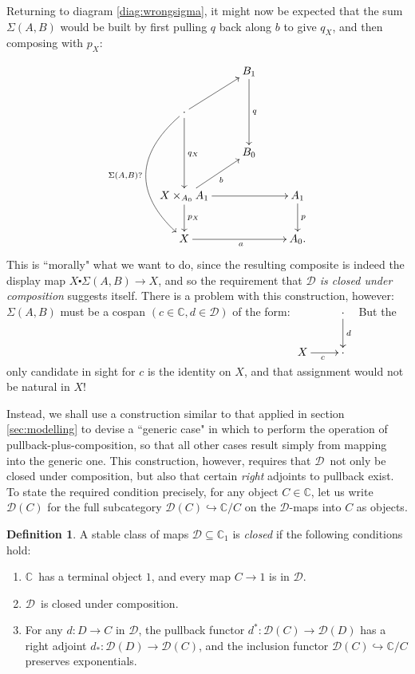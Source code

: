 \documentclass[12pt]{article}
\newcommand{\C}{\ensuremath{\mathbb{C}}}
\newcommand{\D}{\ensuremath{\mathcal{D}}}
\newcommand{\hook}{\ensuremath{\hookrightarrow}}
\newcommand{\btexdot}[2]{\ensuremath{{#1}\!\centerdot\!{#2}}}
\theoremstyle{definition}
\newtheorem{definition}[theorem]{Definition}
\begin{document}
Returning to diagram \eqref{diag:wrongsigma}, it might now be expected that the sum $\Sigma(A,B)$ would be built by first pulling $q$ back along $b$ to give $q_X$, and then composing with $p_X$:

\begin{equation}\label{diag:wrongsigma2}
\xymatrix{
& B_1 \ar[dd]^{q} &\\
\cdot \ar@/_8ex /[ddd]_{\Sigma(A,B)?} \ar[ru] \ar[dd]^{q_X} && \\
& B_0 &\\
X\times_{A_0} A_1 \ar[ru]_-{b} \ar[d]^{p_X} \ar[rr] && A_1 \ar[d]^{p}\\
X \ar[rr]_{a} && A_0.}
\end{equation}
%
This is ``morally" what we want to do, since the resulting composite is indeed the display map  $\btexdot{X}{\Sigma(A,B)}\to X$, and so the requirement that  \emph{$\D$ is closed under composition} suggests itself.  There is a problem with this construction, however: $\Sigma(A,B)$ must be a cospan $(c\in\C,d\in\D)$ of the form:  $\xymatrix{& \cdot \ar[d]^{d} \\
				X \ar[r]_c & \cdot}$
But the only candidate in sight for $c$ is the identity on $X$, and that assignment would not be natural in $X$!  

Instead, we shall use a construction similar to that applied in section \ref{sec:modelling} to devise a ``generic case" in which to perform the operation of pullback-plus-composition, so that all other cases result simply from mapping into the generic one.  This construction, however, requires that \D\  not only be closed under composition, but also that certain \emph{right} adjoints to pullback exist.  To state the required condition precisely, for any object $C\in\C$, let us write $\D(C)$ for the full subcategory $\D(C)\hook\C/C$ on the \D-maps into $C$ as objects.  

\begin{definition}\label{def:closed}
A stable class of maps $\D\subseteq\C_1$ is \emph{closed} if the following conditions hold:
\begin{enumerate}

\item \C\ has a terminal object $1$, and every map $C\to 1$ is in \D.

\item \D\ is closed under composition.

\item  For any $d : D\to C$ in \D, the pullback functor $d^* : \D(C) \to \D(D)$ has a right adjoint $d_* : \D(D) \to \D(C)$, and the inclusion functor $\D(C)\hook\C/C$ preserves exponentials.
\end{enumerate}
\end{definition}
\end{document}
